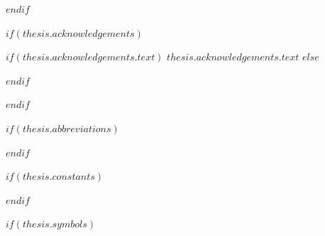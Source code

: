 \begin{abstract}
\addchaptertocentry{\abstractname} %
$abstract$
\end{abstract}

$endif$

$if(thesis.acknowledgements)$

\begin{acknowledgements}
\addchaptertocentry{\acknowledgementname} %
$if(thesis.acknowledgements.text)$
$thesis.acknowledgements.text$
$else$

$endif$
\end{acknowledgements}

$endif$


\begingroup
\hypersetup{linkcolor=$if(toclinkcolor)$$toclinkcolor$$else$black$endif$}

\tableofcontents %

\listoffigures %

\listoftables %

\endgroup


$if(thesis.abbreviations)$

\clearpage


$endif$

$if(thesis.constants)$

\clearpage


$endif$

$if(thesis.symbols)$

\clearpage


